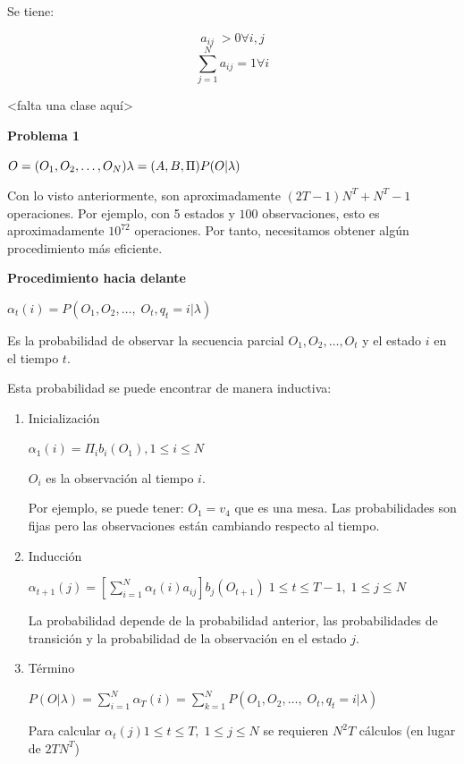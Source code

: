 Se tiene:

$$a_{ij} \; > 0 \forall i, j$$
$$\sum_{j=1}^{N} a_{ij} = 1 \forall i$$

<falta una clase aquí>


\begin{caja}
\textbf{Problema 1}

\begin{math}
O=(O_1, O_2, \ldots , O_N)\\ 
\lambda = (A,B,\Pi) \\
P(O|\lambda)\\
\end{math}


Con lo visto anteriormente, son aproximadamente \((2T-1)N^T+N^T-1\) operaciones. Por ejemplo, con 5
estados y \(100\) observaciones, esto es aproximadamente \(10^{72}\) operaciones. Por tanto, necesitamos obtener
algún procedimiento más eficiente.

\end{caja}

\textbf{Procedimiento hacia delante}

$\alpha_t (i) = P(O_1, O_2, \ldots, \; O_t, q_t = i|\lambda) $

Es la probabilidad de observar la secuencia parcial $O_1, O_2, \ldots, O_t$ y el estado $i$ en el tiempo $t$.

Esta probabilidad se puede encontrar de manera inductiva:


\begin{enumerate}[1.]
	\item Inicialización
	
	$\alpha_1 (i) = \Pi_i b_i (O_1), 1\leq i \leq N$
	
	$O_i$ es la observación al tiempo $i$. 
	
	Por ejemplo, se puede tener: $O_1=v_4$ que es una mesa.
	Las probabilidades son fijas pero las observaciones están cambiando respecto al tiempo.
	
	\item Inducción
	
	$\alpha_{t+1} (j) = \left[ \displaystyle \sum_{i=1}^{N} \alpha_t (i) a_{ij}\right] b_j (O_{t+1}) \; 1 \leq t \leq T -1, \; 1\leq j \leq N $
	
	 La probabilidad depende de la probabilidad anterior, las probabilidades de transición y la probabilidad de
	 la observación en el estado $j$.
	
	
	\item Término
	
	$P(O| \lambda) = \displaystyle \sum_{i=1}^{N} \alpha_T (i) = \displaystyle \sum_{k=1}^{N} P(O_1, O_2, \ldots, \; O_t, q_t = i|\lambda)$
	
	Para calcular $\alpha_t (j) 1 \leq t \leq T, \; 1\leq j \leq N$ se requieren $N^2 T$ cálculos (en lugar de $2TN^T$)
	
	
\end{enumerate}



